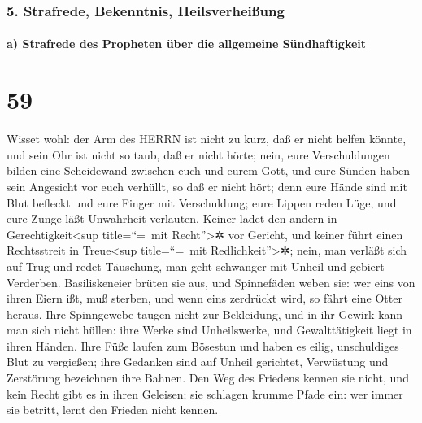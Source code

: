 \hypertarget{strafrede-bekenntnis-heilsverheiuxdfung}{%
\subsubsection{5. Strafrede, Bekenntnis,
Heilsverheißung}\label{strafrede-bekenntnis-heilsverheiuxdfung}}

\hypertarget{a-strafrede-des-propheten-uxfcber-die-allgemeine-suxfcndhaftigkeit}{%
\paragraph{a) Strafrede des Propheten über die allgemeine
Sündhaftigkeit}\label{a-strafrede-des-propheten-uxfcber-die-allgemeine-suxfcndhaftigkeit}}

\hypertarget{section-58}{%
\section{59}\label{section-58}}

Wisset wohl: der Arm des HERRN ist nicht zu kurz, daß er
nicht helfen könnte, und sein Ohr ist nicht so taub, daß er nicht hörte;
nein, eure Verschuldungen bilden eine Scheidewand zwischen
euch und eurem Gott, und eure Sünden haben sein Angesicht vor euch
verhüllt, so daß er nicht hört; denn eure Hände sind mit
Blut befleckt und eure Finger mit Verschuldung; eure Lippen reden Lüge,
und eure Zunge läßt Unwahrheit verlauten. Keiner ladet den
andern in Gerechtigkeit\textless sup title=``=~mit Recht''\textgreater✲
vor Gericht, und keiner führt einen Rechtsstreit in Treue\textless sup
title=``=~mit Redlichkeit''\textgreater✲; nein, man verläßt sich auf
Trug und redet Täuschung, man geht schwanger mit Unheil und gebiert
Verderben. Basiliskeneier brüten sie aus, und Spinnefäden
weben sie: wer eins von ihren Eiern ißt, muß sterben, und wenn eins
zerdrückt wird, so fährt eine Otter heraus. Ihre
Spinngewebe taugen nicht zur Bekleidung, und in ihr Gewirk kann man sich
nicht hüllen: ihre Werke sind Unheilswerke, und Gewalttätigkeit liegt in
ihren Händen. Ihre Füße laufen zum Bösestun und haben es
eilig, unschuldiges Blut zu vergießen; ihre Gedanken sind auf Unheil
gerichtet, Verwüstung und Zerstörung bezeichnen ihre Bahnen.
Den Weg des Friedens kennen sie nicht, und kein Recht gibt
es in ihren Geleisen; sie schlagen krumme Pfade ein: wer immer sie
betritt, lernt den Frieden nicht kennen.

